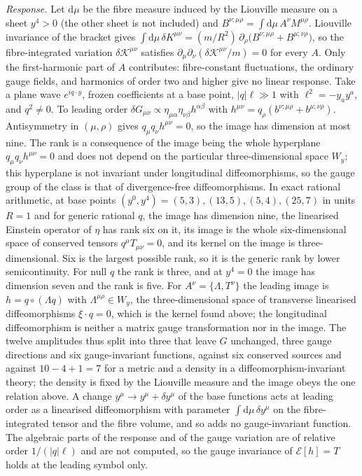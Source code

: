 \emph{Response.} Let \(\mathrm d\mu\) be the fibre measure induced by the Liouville measure on a sheet \(y^4>0\) (the other sheet is not included) and \(B^{\nu;\mu\rho}=\int\mathrm d\mu\,A^\nu M^{\mu\rho}\). Liouville invariance of the bracket gives \(\int\mathrm d\mu\,\delta K^{\mu\nu}=(m/R^2)\,\partial_\rho\bigl(B^{\nu;\mu\rho}+B^{\mu;\nu\rho}\bigr)\), so the fibre-integrated variation \(\delta\mathcal K^{\mu\nu}\) satisfies \(\partial_\mu\partial_\nu(\delta\mathcal K^{\mu\nu}/m)=0\) for every \(A\). Only the first-harmonic part of \(A\) contributes: fibre-constant fluctuations, the ordinary gauge fields, and harmonics of order two and higher give no linear response. Take a plane wave \(e^{iq\cdot y}\), frozen coefficients at a base point, \(|q|\ell\gg1\) with \(\ell^2=-y_ay^a\), and \(q^2\neq0\). To leading order \(\delta G_{\mu\nu}\propto\eta_{\mu\alpha}\eta_{\nu\beta}h^{\alpha\beta}\) with \(h^{\mu\nu}=q_\rho(b^{\nu;\mu\rho}+b^{\mu;\nu\rho})\). Antisymmetry in \((\mu,\rho)\) gives \(q_\mu q_\nu h^{\mu\nu}=0\), so the image has dimension at most nine. The rank is a consequence of the image being the whole hyperplane \(q_\mu q_\nu h^{\mu\nu}=0\) and does not depend on the particular three-dimensional space \(W_y\); this hyperplane is not invariant under longitudinal diffeomorphisms, so the gauge group of the class is that of divergence-free diffeomorphisms. In exact rational arithmetic, at base points \((y^0,y^4)=(5,3),(13,5),(5,4),(25,7)\) in units \(R=1\) and for generic rational \(q\), the image has dimension nine, the linearised Einstein operator of \(\eta\) has rank six on it, its image is the whole six-dimensional space of conserved tensors \(q^\mu T_{\mu\nu}=0\), and its kernel on the image is three-dimensional. Six is the largest possible rank, so it is the generic rank by lower semicontinuity. For null \(q\) the rank is three, and at \(y^4=0\) the image has dimension seven and the rank is five. For \(A^\nu=\{\Lambda,T^\nu\}\) the leading image is \(h=q\circ(\Lambda q)\) with \(\Lambda^{\mu\rho}\in W_y\), the three-dimensional space of transverse linearised diffeomorphisms \(\xi\cdot q=0\), which is the kernel found above; the longitudinal diffeomorphism is neither a matrix gauge transformation nor in the image. The twelve amplitudes thus split into three that leave \(G\) unchanged, three gauge directions and six gauge-invariant functions, against six conserved sources and against \(10-4+1=7\) for a metric and a density in a diffeomorphism-invariant theory; the density is fixed by the Liouville measure and the image obeys the one relation above. A change \(y^\mu\to y^\mu+\delta y^\mu\) of the base functions acts at leading order as a linearised diffeomorphism with parameter \(\int\mathrm d\mu\,\delta y^\mu\) on the fibre-integrated tensor and the fibre volume, and so adds no gauge-invariant function. The algebraic parts of the response and of the gauge variation are of relative order \(1/(|q|\ell)\) and are not computed, so the gauge invariance of \(\mathcal E[h]=T\) holds at the leading symbol only.



